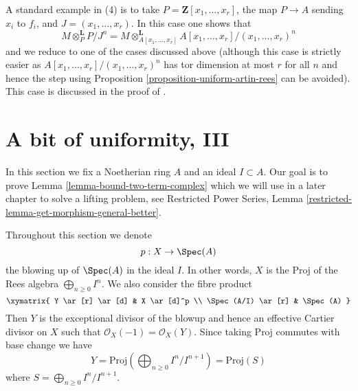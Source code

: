 \begin{remark}
\medskip\noindent
A standard example in (4) is to take $P = \mathbf{Z}[x_1, \ldots, x_r]$,
the map $P \to A$ sending $x_i$ to $f_i$, and $J = (x_1, \ldots, x_r)$.
In this case one shows that
$$
M \otimes_P^\mathbf{L} P/J^n =
M \otimes_{A[x_1, \ldots, x_r]}^\mathbf{L}
A[x_1, \ldots, x_r]/(x_1, \ldots, x_r)^n
$$
and we reduce to one of the cases discussed above (although this case
is strictly easier as $A[x_1, \ldots, x_r]/(x_1, \ldots, x_r)^n$ has
tor dimension at most $r$ for all $n$ and hence the step using
Proposition \ref{proposition-uniform-artin-rees} can be avoided).
This case is discussed in the proof of \cite[Proposition 3.5.1]{BS}.
\end{remark}








\section{A bit of uniformity, III}
\label{section-uniform}

\noindent
In this section we fix a Noetherian ring $A$ and an ideal $I \subset A$.
Our goal is to prove Lemma \ref{lemma-bound-two-term-complex} which we will
use in a later chapter to solve a lifting problem, see
Restricted Power Series, Lemma
\ref{restricted-lemma-get-morphism-general-better}.

\medskip\noindent
Throughout this section we denote
$$
p : X \to \Spec(A)
$$
the blowing up of $\Spec(A)$ in the ideal $I$. In other words, $X$ is the
$\text{Proj}$ of the Rees algebra $\bigoplus_{n \geq 0} I^n$. We also consider
the fibre product
$$
\xymatrix{
Y \ar[r] \ar[d] & X \ar[d]^p \\
\Spec(A/I) \ar[r] & \Spec(A)
}
$$
Then $Y$ is the exceptional divisor of the blowup and hence
an effective Cartier divisor on $X$ such that
$\mathcal{O}_X(-1) = \mathcal{O}_X(Y)$. Since taking $\text{Proj}$
commutes with base change we have
$$
Y = \text{Proj}(\bigoplus\nolimits_{n \geq 0} I^n/I^{n + 1}) = \text{Proj}(S)
$$
where $S = \bigoplus_{n \geq 0} I^n/I^{n + 1}$.

